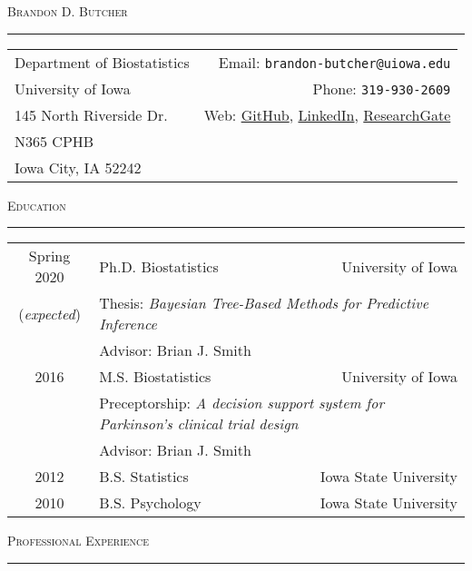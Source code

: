 \documentclass[a4paper]{article}
\newcommand{\LinkedIn}{\href{https://www.linkedin.com/in/brandon-butcher-72250153/}{LinkedIn}}
\newcommand{\ResearchGate}{\href{https://www.researchgate.net/profile/Brandon_Butcher}{ResearchGate}}
\newcommand{\GitHub}{\href{https://github.com/brandondbutcher}{GitHub}}
\begin{document}
\begin{center}
  \Huge\textsc{Brandon D. Butcher}
  \textcolor{usafagrey}{\rule{\textwidth}{1pt}}
\end{center}


\begin{tabular*}{0.95\textwidth}{@{\extracolsep{\fill}}lr}
  Department of Biostatistics & Email: \texttt{brandon-butcher@uiowa.edu} \\
  University of Iowa & Phone: \texttt{319-930-2609} \\
  145 North Riverside Dr.  & Web: \GitHub, \LinkedIn, \ResearchGate \\
  N365 CPHB & \\
  Iowa City, IA 52242 &  \\
\end{tabular*}
\vspace{\baselineskip}


\begin{flushleft}
  \Large\textsc{Education}
  \textcolor{usafagrey}{\rule[0.5\baselineskip]{\textwidth}{0.75pt}}
\end{flushleft}
\vspace{-\baselineskip}

\begin{tabular*}{0.96\textwidth}{@{\extracolsep{\fill}}clr}
  Spring 2020 & Ph.D. Biostatistics & University of Iowa \\
 (\textit{expected}) & \multicolumn{2}{l}{Thesis: \textit{Bayesian Tree-Based Methods for
      Predictive Inference}} \\
   & Advisor: Brian J. Smith & \\[3pt]
  2016 & M.S. Biostatistics & University of Iowa \\
   & \multicolumn{2}{l}{
    Preceptorship: \textit{
      A decision support system for Parkinson's clinical trial design
   }} \\
   & Advisor: Brian J. Smith & \\[3pt]
  2012 & B.S. Statistics & Iowa State University \\
  2010 & B.S. Psychology & Iowa State University
\end{tabular*}
\vspace{0.25\baselineskip}


\begin{flushleft}
  \Large\textsc{Professional Experience}
  \textcolor{usafagrey}{\rule[0.5\baselineskip]{\textwidth}{0.75pt}}
\end{flushleft}
\vspace{-\baselineskip}
\end{document}
